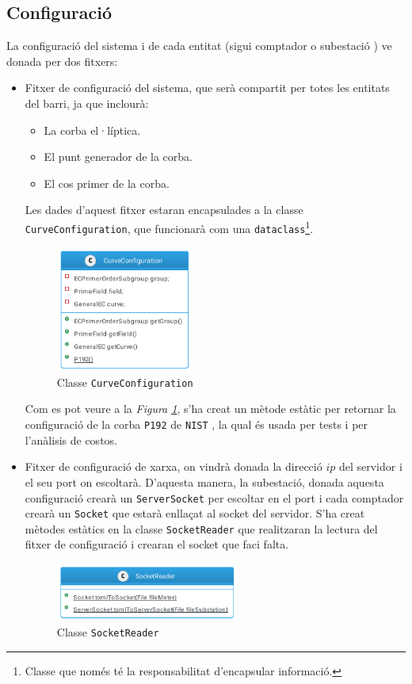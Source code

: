 \subsection{Configuració}
La configuració del sistema i de cada entitat (sigui comptador o subestació ) ve donada per dos fitxers:
\begin{itemize}
	\item Fitxer de configuració del sistema, que serà compartit per totes les entitats del barri, ja que inclourà:
	\begin{itemize}
		\item La corba el·líptica.
		\item El punt generador de la corba.
		\item El cos primer de la corba.
	\end{itemize}
	Les dades d'aquest fitxer estaran encapsulades a la classe \texttt{CurveConfiguration}, que funcionarà com una \texttt{dataclass}\footnote{Classe que només té la responsabilitat d'encapsular informació.}.
	\begin{figure}[H]
		\centering
		\includegraphics[width=4.5cm]{classes/curve.png}
		\caption{Classe \texttt{CurveConfiguration}}
		\label{fig:curve}
	\end{figure}
	Com es pot veure a la \textit{Figura \ref{fig:curve}}, s'ha creat un mètode estàtic per retornar la configuració de la corba \texttt{P192} de \texttt{NIST} \cite{p192}, la qual és usada per tests i per l'anàlisis de costos.
	\item Fitxer de configuració de xarxa, on vindrà donada la direcció $ip$ del servidor i el seu port on escoltarà. D'aquesta manera, la subestació, donada aquesta configuració crearà un \texttt{ServerSocket} per escoltar en el port i cada comptador crearà un \texttt{Socket} que estarà enllaçat al socket del servidor. S'ha creat mètodes estàtics en la classe \texttt{SocketReader} que realitzaran la lectura del fitxer de configuració i crearan el socket que faci falta.
	\begin{figure}[H]
		\centering
		\includegraphics[width=6cm]{classes/socket.png}
		\caption{Classe \texttt{SocketReader}}
		\label{fig:socket}
	\end{figure}
	
\end{itemize}
